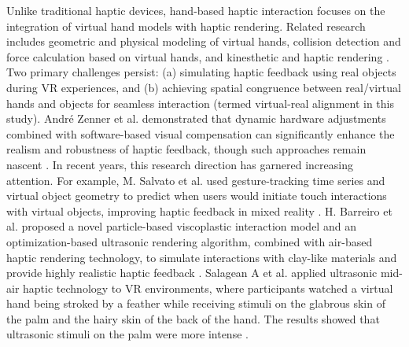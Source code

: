 Unlike traditional haptic devices, hand-based haptic interaction focuses on the integration of virtual hand models with haptic rendering. Related research includes geometric and physical modeling of virtual hands, collision detection and force calculation based on virtual hands, and kinesthetic and haptic rendering \cite{tong2023survey}. Two primary challenges persist: (a) simulating haptic feedback using real objects during VR experiences, and (b) achieving spatial congruence between real/virtual hands and objects for seamless interaction (termed virtual-real alignment in this study). André Zenner et al. demonstrated that dynamic hardware adjustments combined with software-based visual compensation can significantly enhance the realism and robustness of haptic feedback, though such approaches remain nascent \cite{zenner2021combining}. In recent years, this research direction has garnered increasing attention. For example, M. Salvato et al. used gesture-tracking time series and virtual object geometry to predict when users would initiate touch interactions with virtual objects, improving haptic feedback in mixed reality \cite{salvato2022predicting}. H. Barreiro et al. proposed a novel particle-based viscoplastic interaction model and an optimization-based ultrasonic rendering algorithm, combined with air-based haptic rendering technology, to simulate interactions with clay-like materials and provide highly realistic haptic feedback \cite{barreiro2021natural}. Salagean A et al. applied ultrasonic mid-air haptic technology to VR environments, where participants watched a virtual hand being stroked by a feather while receiving stimuli on the glabrous skin of the palm and the hairy skin of the back of the hand. The results showed that ultrasonic stimuli on the palm were more intense \cite{salagean2022virtual}.